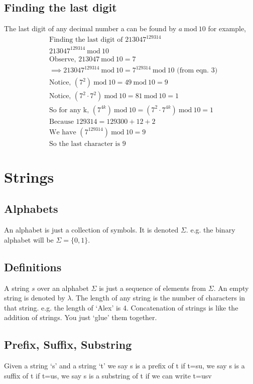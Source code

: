 \documentclass[12pt] {article}
\newcommand{\Mod}[1]{\ \mathrm{mod}\ #1}
\begin{document}
\subsection*{Finding the last digit}
The last digit of any decimal number a can be found by $a \Mod 10$ for example,
\begin{align*}
  &\text{Finding the last digit of } 213047^{129314} \\
  &213047^{129314} \Mod 10 \\
  &\text{Observe, } 213047 \Mod 10 = 7 \\
  &\implies  213047^{129314} \Mod 10 = 7^{129314} \Mod 10 \text{ (from eqn. 3)} \\
  &\text{Notice, } (7^2) \Mod 10 = 49 \Mod 10 = 9 \\
  &\text{Notice, } (7^2 \cdot 7^2) \Mod 10 = 81 \Mod 10 = 1 \\
  &\text{So for any k, } (7^{4k}) \Mod 10 = (7^2 \cdot 7^{4k}) \Mod 10 = 1 \\
  &\text{Because } 129314  = 129300+12+2 \\
  &\text{We have } (7^{129314}) \Mod 10 = 9 \\
  &\text{So the last character is 9}
\end{align*}

\section*{Strings}
\subsection*{Alphabets}
An alphabet is just a collection of symbols. It is denoted $\Sigma$. e.g.
the binary alphabet will be $\Sigma = \{0,1\}$.

\subsection*{Definitions}
A string $s$ over an alphabet $\Sigma$ is just a sequence of elements from $\Sigma$.
An empty string is denoted by $\lambda$. The length of any string is the number of characters in that string. e.g. the length of 
`Alex' is 4. 
Concatenation of strings is like the addition of strings. You just `glue' them together.

\subsection*{Prefix, Suffix, Substring}
Given a string `s' and a string `t' we say s is a prefix of t if t=su, 
we say s is a suffix of t if t=us,
we say s is a substring of t if we can write t=usv
\end{document}
